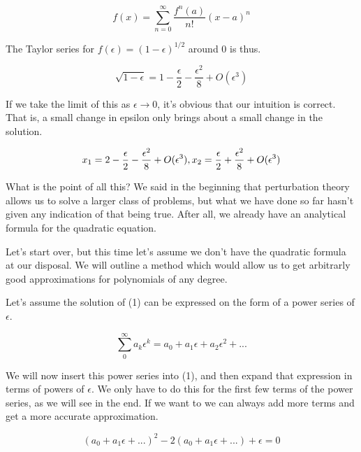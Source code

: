 \documentclass[12pt]{article}
\begin{document}
\begin{equation}
f(x) = \sum_{n=0}^{\infty} \frac{f^{n}(a)}{n!} (x-a)^n
\end{equation}

The Taylor series for $f(\epsilon) = (1 - \epsilon)^{1/2}$ around 0 is thus.

\begin{equation}
\sqrt{1 - \epsilon} = 1 - \frac{\epsilon}{2} - \frac{\epsilon^2}{8} + O(\epsilon^3)
\end{equation}

If we take the limit of this as $\epsilon \to 0$, it's obvious that our
intuition is correct. That is, a small change in epsilon only brings about a
small change in the solution.

\begin{equation}
x_1 = 2 - \frac{\epsilon}{2} - \frac{\epsilon^2}{8} + O(\epsilon^3), \\
x_2 = \frac{\epsilon}{2} + \frac{\epsilon^2}{8} + O(\epsilon^3)
\end{equation}

What is the point of all this? We said in the beginning that perturbation theory
allows us to solve a larger class of problems, but what we have done so far
hasn't given any indication of that being true. After all, we already have an
analytical formula for the quadratic equation.

Let's start over, but this time let's assume we don't have the quadratic formula
at our disposal. We will outline a method which would allow us to get arbitrarly
good approximations for polynomials of any degree.

Let's assume the solution of (1) can be expressed on the form of a power series
of $\epsilon$.

\begin{equation}
\sum_0^{\infty} a_k \epsilon^k = a_0 + a_1 \epsilon + a_2 \epsilon^2 + ...
\end{equation}

We will now insert this power series into (1), and then expand that expression
in terms of powers of $\epsilon$. We only have to do this for the first few
terms of the power series, as we will see in the end. If we want to we can
always add more terms and get a more accurate approximation.

\begin{equation}
(a_0 + a_1 \epsilon + ...)^2 - 2(a_0 + a_1 \epsilon + ...) + \epsilon = 0
\end{equation}
\end{document}
